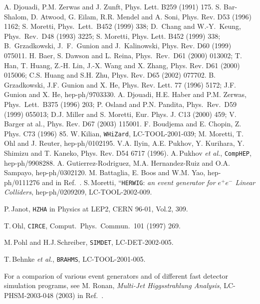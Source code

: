 \begin{thebibliography}{999}
  A. Djouadi, P.M. Zerwas and J. Zunft, Phys. Lett. B259
(1991) 175. 
%
 S. Bar-Shalom, D. Atwood, G. Eilam, R.R. Mendel and 
A. Soni, Phys. Rev. D53 (1996) 1162; 
S. Moretti, Phys.~Lett.~B452 (1999) 338; 
D.~Chang and W.-Y.~Keung, Phys.~Rev.~D48 (1993) 3225; 
S. Moretti, Phys. Lett. B452 (1999) 338; 
B.~Grzadkowski, J.~F.~Gunion and J.~Kalinowski, Phys. Rev. D60 (1999) 075011.
H. Baer, S. Dawson and L. Reina, Phys.\ Rev.\ D61 (2000) 013002;
T. Han, T. Huang, Z.-H. Lin, J.-X. Wang and X. Zhang, Phys. Rev. D61 (2000) 
015006; C.S. Huang and S.H. Zhu, Phys. Rev. D65 (2002) 077702. 
 B. Grzadkowski, J.F. Gunion and X. He, Phys. Rev. Lett.
77 (1996) 5172; J.F. Gunion and X. He, hep-ph/9703330. 
%
A. Djouadi, H.E. Haber and P.M. Zerwas, Phys.~Lett.~B375 (1996) 203; 
P. Osland and P.N. Pandita, Phys.~Rev.~D59 (1999) 055013;  
D.J. Miller and S. Moretti, Eur. Phys. J. C13 (2000) 459; 
V. Barger at al., Phys. Rev. D67 (2003) 115001.
%
  F. Boudjema and E. Chopin,  Z. Phys. C73 (1996) 85.
%
 W.\,Kilian, {\tt WHiZard}, LC-TOOL-2001-039; 
M. Moretti, T. Ohl and J. Reuter, hep-ph/0102195. 
%
 V.A. Ilyin, A.E. Pukhov, Y. Kurihara, Y. Shimizu and 
T. Kaneko, Phys. Rev. D54 6717 (1996).  
%
 A.\,Pukhov {\it et al.},  {\tt CompHEP}, hep-ph/9908288.
%
 A. Gutierrez-Rodriguez, M.A. Hernandez-Ruiz and O.A. 
Sampayo, hep-ph/0302120. 
%
 M. Battaglia, E. Boos and W.M. Yao, hep-ph/0111276 
and in Ref.~\cite{CLIC}. 
%
%
 S.\,Moretti, 
``{\tt HERWIG}: {\it an event generator for $e^+e^-$ Linear Colliders}, 
hep-ph/0209209, LC-TOOL-2002-009.

 P.\,Janot, {\tt HZHA} in Physics at LEP2, CERN 96-01, Vol.2, 309.

 T.\,Ohl, {\tt CIRCE}, Comput.\ Phys.\ Commun.\  101 (1997) 269. 

 M.\,Pohl and H.J.\,Schreiber, {\tt SIMDET}, LC-DET-2002-005.

 T.\,Behnke {\it et al.}, {\tt BRAHMS}, LC-TOOL-2001-005.

 For a comparion of various event generators and of different
fast detector simulation programs, see M. Ronan, {\it Multi-Jet Higgsstrahlung 
Analysis}, LC-PHSM-2003-048 (2003) in Ref.~\cite{LC-Notes}.


\end{thebibliography}
